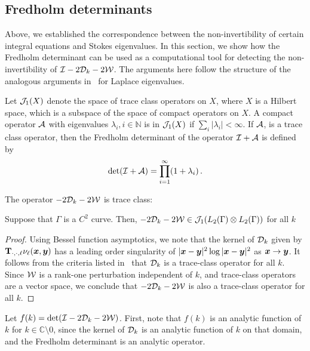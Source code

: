 \subsection{Fredholm determinants}
\label{sec:dets}
Above, we established the correspondence between
the non-invertibility of certain integral equations
and Stokes eigenvalues. In this section, we show
how the Fredholm determinant can be used
as a computational tool for detecting the
non-invertibility of $\mathcal I - 2{\mathcal D}_{k} - 2{\mathcal W}$.
The arguments here follow the structure of the
analogous arguments in~\cite{zhao2015robust}
for Laplace eigenvalues.

Let ${\mathcal J}_{1}(X)$ denote the space of trace class operators 
on $X$, where $X$ is a Hilbert space, which is a
subspace of the space of compact operators on $X$.
A compact operator ${\mathcal A}$ with eigenvalues
$\lambda_{i}, i\in \mathbb{N}$ is in ${\mathcal J}_{1}(X)$ if
$\sum_{i} |\lambda_{i}| < \infty$.
If ${\mathcal A}$, is a trace class operator, then  
the Fredholm determinant of the operator $\mathcal I + {\mathcal A}$
is defined by
\begin{equation}
\text{det}(\mathcal I +{\mathcal A}) = \prod_{i=1}^{\infty} (1+\lambda_{i}) \, .
\end{equation}

The operator $-2{\mathcal D}_{k} - 2{\mathcal W}$ is trace class:
\begin{lemma}
  Suppose that $\Gamma$ is a $C^2$ curve.
  Then, $-2{\mathcal D}_{k} - 2{\mathcal W} \in {\mathcal J}_1(L_2(\Gamma)\otimes L_2(\Gamma))$
  for all $k$ 
\end{lemma}
\begin{proof}
Using Bessel function asymptotics, we note that the
kernel of ${\mathcal D}_{k}$ given by ${\bf T}_{\cdot,\cdot,\ell}\nu_{\ell}({\boldsymbol x},{\boldsymbol y})$
has a leading order singularity of
$|{\boldsymbol x}-{\boldsymbol y}|^2 \log{|{\boldsymbol x}-{\boldsymbol y}|^2}$ as ${\boldsymbol x}\to {\boldsymbol y}$.
It follows from the criteria listed
in~\cite[Sec. 2]{bornemann2010numerical} that ${\mathcal D}_{k}$
is a trace-class operator for all $k$.
Since ${\mathcal W}$ is a rank-one perturbation independent of $k$,
and trace-class operators are a vector space, we conclude
that $-2{\mathcal D}_{k} - 2{\mathcal W}$ is also a trace-class operator for
all $k$.
\end{proof}

Let $f(k) = \text{det}(\mathcal I - 2{\mathcal D}_{k} - 2{\mathcal W})$.
First, note that $f(k)$ is an analytic function of $k$
for $k \in \mathbb{C} \setminus 0$, since the kernel
of ${\mathcal D}_{k}$ is an analytic function of $k$ on that domain, 
and the Fredholm determinant is an analytic operator.

